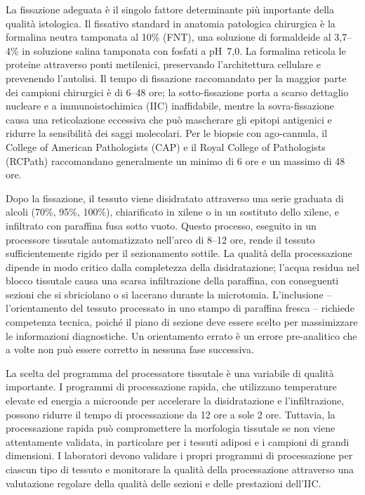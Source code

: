 La fissazione adeguata è il singolo fattore determinante più importante della qualità istologica.
Il fissativo standard in anatomia patologica chirurgica è la formalina neutra tamponata al 10\%
(FNT), una soluzione di formaldeide al 3,7--4\% in soluzione salina tamponata con fosfati a
pH~7,0. La formalina reticola le proteine attraverso ponti metilenici, preservando l'architettura
cellulare e prevenendo l'autolisi. Il tempo di fissazione raccomandato per la maggior parte dei
campioni chirurgici è di 6--48 ore; la sotto-fissazione porta a scarso dettaglio nucleare e a
immunoistochimica (IIC) inaffidabile, mentre la sovra-fissazione causa una reticolazione eccessiva
che può mascherare gli epitopi antigenici e ridurre la sensibilità dei saggi molecolari. Per le
biopsie con ago-cannula, il College of American Pathologists (CAP) e il Royal College of
Pathologists (RCPath) raccomandano generalmente un minimo di 6 ore e un massimo di 48 ore.

Dopo la fissazione, il tessuto viene disidratato attraverso una serie graduata di alcoli (70\%,
95\%, 100\%), chiarificato in xilene o in un sostituto dello xilene, e infiltrato con paraffina
fusa sotto vuoto. Questo processo, eseguito in un processore tissutale automatizzato nell'arco di
8--12 ore, rende il tessuto sufficientemente rigido per il sezionamento sottile. La qualità della
processazione dipende in modo critico dalla completezza della disidratazione; l'acqua residua nel
blocco tissutale causa una scarsa infiltrazione della paraffina, con conseguenti sezioni che si
sbriciolano o si lacerano durante la microtomia. L'inclusione -- l'orientamento del tessuto
processato in uno stampo di paraffina fresca -- richiede competenza tecnica, poiché il piano di
sezione deve essere scelto per massimizzare le informazioni diagnostiche. Un orientamento errato
è un errore pre-analitico che a volte non può essere corretto in nessuna fase successiva.

La scelta del programma del processatore tissutale è una variabile di qualità importante. I
programmi di processazione rapida, che utilizzano temperature elevate ed energia a microonde per
accelerare la disidratazione e l'infiltrazione, possono ridurre il tempo di processazione da 12
ore a sole 2 ore. Tuttavia, la processazione rapida può compromettere la morfologia tissutale se
non viene attentamente validata, in particolare per i tessuti adiposi e i campioni di grandi
dimensioni. I laboratori devono validare i propri programmi di processazione per ciascun tipo di
tessuto e monitorare la qualità della processazione attraverso una valutazione regolare della
qualità delle sezioni e delle prestazioni dell'IIC.

